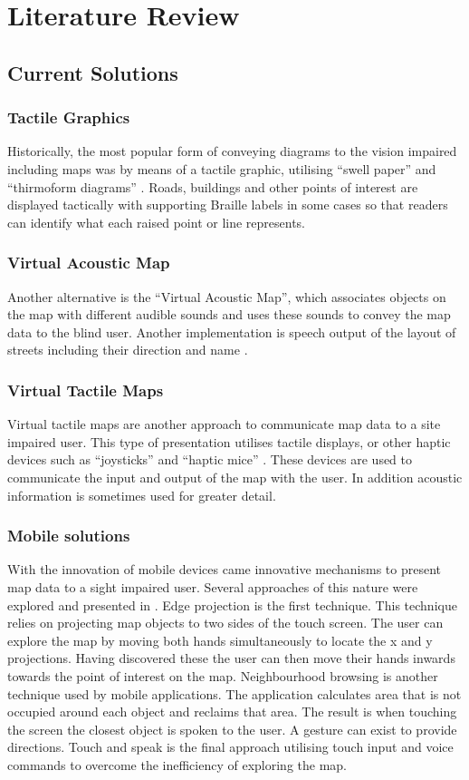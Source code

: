 \documentclass[11pt,twoside,a4paper]{article}
\begin{document}
\section{Literature Review}
\subsection{Current Solutions}
\subsubsection{Tactile Graphics}
Historically, the most popular form of conveying diagrams to the vision
impaired including maps was by means of a tactile graphic, utilising ``swell paper'' and ``thirmoform diagrams''
\cite{mccallum2003}. Roads, buildings and other points of interest are
displayed tactically with supporting Braille labels in some cases so that
readers can identify what each raised point or line represents.

\subsubsection{Virtual Acoustic Map}
Another alternative is the ``Virtual Acoustic Map'', which associates
objects on the map with different audible sounds and uses these sounds
to convey the map data to the blind user. Another implementation is speech output of the layout
of streets including their direction and name \cite{Hoeckner2012}.

\subsubsection{Virtual Tactile Maps}
Virtual tactile maps are another approach to communicate map data to a
site impaired user. This type of presentation utilises tactile displays,
or other haptic devices such as ``joysticks'' and ``haptic mice''
\cite{Parente2003}. These devices are used to communicate the input and
output of the map with the user. In addition acoustic information is
sometimes used for greater detail.

\subsubsection{Mobile solutions}
With the innovation of mobile devices came innovative mechanisms to
present map data to a sight impaired user. Several approaches of this
nature were explored and presented in \cite{Kane2011}. Edge projection
is the first technique. This technique relies on projecting map objects
to two sides of the touch screen. The user can explore the map by moving
both hands simultaneously to locate the x and y projections. Having
discovered these the user can then move their hands inwards towards the
point of interest on the map. Neighbourhood browsing is another
technique used by mobile applications. The application calculates area
that is not occupied around each object and reclaims that area. The
result is when touching the screen the closest object is spoken to the
user. A gesture can exist to provide directions. Touch and speak is the
final approach utilising touch input and voice commands to overcome the
inefficiency of exploring the map.
\end{document}
